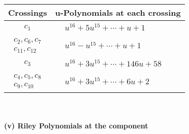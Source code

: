 \documentclass[1p]{elsarticle_modified}
\theoremstyle{definition}
\begin{document}
\begin{tabular}{m{50pt}|m{274pt}}
Crossings & \hspace{64pt}u-Polynomials at each crossing \\
\hline $$\begin{aligned}c_{1}\end{aligned}$$&$\begin{aligned}
&u^{16}+5 u^{15}+\cdots+u+1
\end{aligned}$\\
\hline $$\begin{aligned}c_{2},c_{6},c_{7}\\c_{11},c_{12}\end{aligned}$$&$\begin{aligned}
&u^{16}- u^{15}+\cdots+u+1
\end{aligned}$\\
\hline $$\begin{aligned}c_{3}\end{aligned}$$&$\begin{aligned}
&u^{16}+3 u^{15}+\cdots+146 u+58
\end{aligned}$\\
\hline $$\begin{aligned}c_{4},c_{5},c_{8}\\c_{9},c_{10}\end{aligned}$$&$\begin{aligned}
&u^{16}+3 u^{15}+\cdots+6 u+2
\end{aligned}$\\
\hline
\end{tabular}\\~\\
\newpage\renewcommand{\arraystretch}{1}
\flushleft \textbf{(v) Riley Polynomials at the component}\newline \\
\end{document}
